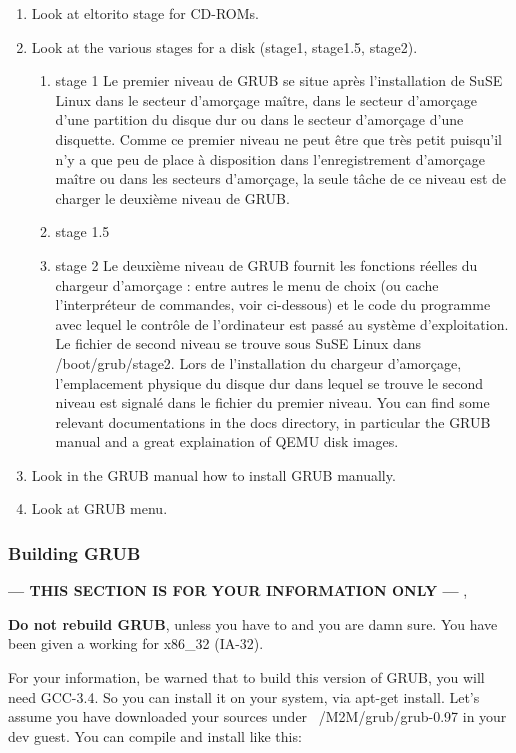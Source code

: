 \documentclass[10]{article}
\begin{document}
\begin{enumerate}
\item
Look at eltorito stage for CD-ROMs.
\item
Look at the various stages for a disk (stage1, stage1.5, stage2).
\begin{enumerate}
\item stage 1
Le premier niveau de GRUB se situe apr\`es l'installation de SuSE Linux dans le secteur d'amorçage maître, dans le secteur d'amorçage d'une partition du disque dur ou dans le secteur d'amorçage d'une disquette. Comme ce premier niveau ne peut être que tr\`es petit puisqu'il n'y a que peu de place \`a disposition dans l'enregistrement d'amorçage maître ou dans les secteurs d'amorçage, la seule tâche de ce niveau est de charger le deuxi\`eme niveau de GRUB.

\item stage 1.5
\item stage 2
Le deuxi\`eme niveau de GRUB fournit les fonctions réelles du chargeur d'amorçage : entre autres le menu de choix (ou cache l'interpréteur de commandes, voir ci-dessous) et le code du programme avec lequel le contrôle de l'ordinateur est passé au syst\`eme d'exploitation. Le fichier de second niveau se trouve sous SuSE Linux dans /boot/grub/stage2. Lors de l'installation du chargeur d'amorçage, l'emplacement physique du disque dur dans lequel se trouve le second niveau est signalé dans le fichier du premier niveau.
You can find some relevant documentations in the docs directory,
in particular the GRUB manual and a great explaination of QEMU disk
images.

\end{enumerate}
\item
Look in the GRUB manual how to install GRUB manually.
\item 
Look at GRUB menu.
\end{enumerate}

\subsubsection{Building GRUB}

{\bf --- THIS SECTION IS FOR YOUR INFORMATION ONLY --- },

{\bf Do not rebuild GRUB}, unless you have to and you are damn sure. 
You have been given a working for x86\_32 (IA-32). 

For your information, be warned that to build this version of GRUB, 
you will need GCC-3.4. So you can install it on your system, via apt-get install.
Let's assume you have downloaded your sources under ~/M2M/grub/grub-0.97
in your dev guest. You can compile and install like this:
\end{document}
